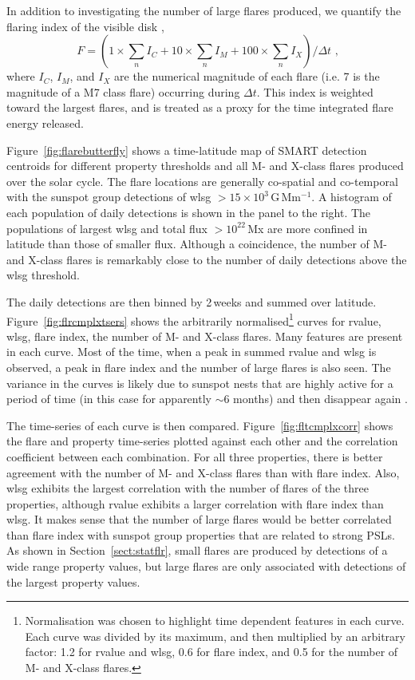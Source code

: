 In addition to investigating the number of large flares produced, we quantify the flaring index of the visible disk \citep{Antalova:1996},
\begin{equation}
F = (1 \times \sum_n I_C + 10 \times \sum_n I_M + 100 \times \sum_n I_X )/\Delta t \mbox{ ,}
\end{equation}
where $I_C$, $I_M$, and $I_X$ are the numerical magnitude of each flare (i.e. 7 is the magnitude of a M7 class flare) occurring during $\Delta t$. This index is weighted toward the largest flares, and is treated as a proxy for the time integrated flare energy released.


Figure~\ref{fig:flarebutterfly} shows a time-latitude map of \gls{SMART} detection centroids for different property thresholds and all M- and X-class flares produced over the solar cycle. The flare locations are generally co-spatial and co-temporal with the sunspot group detections of \gls{wlsg} $>15\times10^3$\,G\,Mm$^{-1}$. A histogram of each population of daily detections is shown in the panel to the right. The populations of largest \gls{wlsg} and total flux $>10^{22}$\,Mx are more confined in latitude than those of smaller flux. Although a coincidence, the number of M- and X-class flares is remarkably close to the number of daily detections above the \gls{wlsg} threshold.

The daily detections are then binned by 2\,weeks and summed over latitude. Figure~\ref{fig:flrcmplxtsers} shows the arbitrarily normalised\footnote{Normalisation was chosen to highlight time dependent features in each curve. Each curve was divided by its maximum, and then multiplied by an arbitrary factor: 1.2 for \gls{rvalue} and \gls{wlsg}, 0.6 for flare index, and 0.5 for the number of M- and X-class flares.} curves for \gls{rvalue}, \gls{wlsg}, flare index, the number of M- and X-class flares. Many features are present in each curve. Most of the time, when a peak in summed \gls{rvalue} and \gls{wlsg} is observed, a peak in flare index and the number of large flares is also seen. The variance in the curves is likely due to sunspot nests that are highly active for a period of time (in this case for apparently $\sim$6 months) and then disappear again \citep{Pojoga:2002}. 

The time-series of each curve is then compared. Figure~\ref{fig:fltcmplxcorr} shows the flare and property time-series plotted against each other and the correlation coefficient between each combination. For all three properties, there is better agreement with the number of M- and X-class flares than with flare index. Also, \gls{wlsg} exhibits the largest correlation with the number of flares of the three properties, although \gls{rvalue} exhibits a larger correlation with flare index than \gls{wlsg}. It makes sense that the number of large flares would be better correlated than flare index with sunspot group properties that are related to strong \glspl{PSL}. As shown in Section~\ref{sect:statflr}, small flares are produced by detections of a wide range property values, but large flares are only associated with detections of the largest property values.

